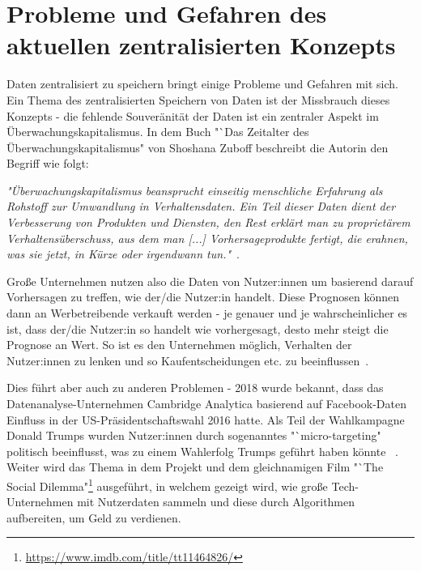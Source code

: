\documentclass[acmtog]{acmart}
\begin{document}
\section{Probleme und Gefahren des aktuellen zentralisierten Konzepts}
%
Daten zentralisiert zu speichern bringt einige Probleme und Gefahren mit sich. Ein Thema des zentralisierten Speichern von Daten ist der Missbrauch dieses Konzepts - die fehlende Souveränität der Daten ist ein zentraler Aspekt im Überwachungskapitalismus. In dem Buch "`Das Zeitalter des Überwachungskapitalismus" von Shoshana Zuboff beschreibt die Autorin den Begriff wie folgt: 

\textit{"Überwachungskapitalismus beansprucht einseitig menschliche Erfahrung als Rohstoff zur Umwandlung in Verhaltensdaten. Ein Teil dieser Daten dient der Verbesserung von Produkten und Diensten, den Rest erklärt man zu proprietärem Verhaltensüberschuss, aus dem man [...] Vorhersageprodukte fertigt, die erahnen, was sie jetzt, in Kürze oder irgendwann tun."}~\cite{zuboff2018ueberwachungskapitalismus}.

Große Unternehmen nutzen also die Daten von Nutzer:innen um basierend darauf Vorhersagen zu treffen, wie der/die Nutzer:in handelt. Diese Prognosen können dann an Werbetreibende verkauft werden - je genauer und je wahrscheinlicher es ist, dass der/die Nutzer:in so handelt wie vorhergesagt, desto mehr steigt die Prognose an Wert. So ist es den Unternehmen möglich, Verhalten der Nutzer:innen zu lenken und so Kaufentscheidungen etc. zu beeinflussen~\cite{zuboff2018ueberwachungskapitalismus}.

Dies führt aber auch zu anderen Problemen - 2018 wurde bekannt, dass das Datenanalyse-Unternehmen Cambridge Analytica basierend auf Facebook-Daten Einfluss in der US-Präsidentschaftswahl 2016 hatte. Als Teil der Wahlkampagne Donald Trumps wurden Nutzer:innen durch sogenanntes "`micro-targeting" politisch beeinflusst, was zu einem Wahlerfolg Trumps geführt haben könnte ~\cite{isaak2018cambridgeanalytica}. Weiter wird das Thema in dem Projekt und dem gleichnamigen Film "`The Social Dilemma"\footnote{\url{https://www.imdb.com/title/tt11464826/}} ausgeführt, in welchem gezeigt wird, wie große Tech-Unternehmen mit Nutzerdaten sammeln und diese durch Algorithmen aufbereiten, um Geld zu verdienen.
\end{document}
